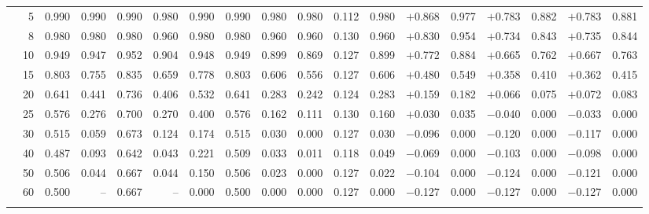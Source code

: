 \documentclass[conference]{IEEEtran}
\theoremstyle{remark}
\begin{document}
\begin{table}[ht]
{\begin{tabular}{p{2.2cm}r rrrr rr rr rr rr rr rr}
  & 5  & 0.990 & 0.990 & 0.990 & 0.980 & 0.990 & 0.990 & 0.980 & 0.980 & 0.112 & 0.980 & $+$0.868 & 0.977 & $+$0.783 & 0.882 & $+$0.783 & 0.881 \\
  & 8  & 0.980 & 0.980 & 0.980 & 0.960 & 0.980 & 0.980 & 0.960 & 0.960 & 0.130 & 0.960 & $+$0.830 & 0.954 & $+$0.734 & 0.843 & $+$0.735 & 0.844 \\
  & 10 & 0.949 & 0.947 & 0.952 & 0.904 & 0.948 & 0.949 & 0.899 & 0.869 & 0.127 & 0.899 & $+$0.772 & 0.884 & $+$0.665 & 0.762 & $+$0.667 & 0.763 \\
  & 15 & 0.803 & 0.755 & 0.835 & 0.659 & 0.778 & 0.803 & 0.606 & 0.556 & 0.127 & 0.606 & $+$0.480 & 0.549 & $+$0.358 & 0.410 & $+$0.362 & 0.415 \\
  & 20 & 0.641 & 0.441 & 0.736 & 0.406 & 0.532 & 0.641 & 0.283 & 0.242 & 0.124 & 0.283 & $+$0.159 & 0.182 & $+$0.066 & 0.075 & $+$0.072 & 0.083 \\
  & 25 & 0.576 & 0.276 & 0.700 & 0.270 & 0.400 & 0.576 & 0.162 & 0.111 & 0.130 & 0.160 & $+$0.030 & 0.035 & $-$0.040 & 0.000 & $-$0.033 & 0.000 \\
  & 30 & 0.515 & 0.059 & 0.673 & 0.124 & 0.174 & 0.515 & 0.030 & 0.000 & 0.127 & 0.030 & $-$0.096 & 0.000 & $-$0.120 & 0.000 & $-$0.117 & 0.000 \\
  & 40 & 0.487 & 0.093 & 0.642 & 0.043 & 0.221 & 0.509 & 0.033 & 0.011 & 0.118 & 0.049 & $-$0.069 & 0.000 & $-$0.103 & 0.000 & $-$0.098 & 0.000 \\
  & 50 & 0.506 & 0.044 & 0.667 & 0.044 & 0.150 & 0.506 & 0.023 & 0.000 & 0.127 & 0.022 & $-$0.104 & 0.000 & $-$0.124 & 0.000 & $-$0.121 & 0.000 \\
  & 60 & 0.500 & -- & 0.667 & -- & 0.000 & 0.500 & 0.000 & 0.000 & 0.127 & 0.000 & $-$0.127 & 0.000 & $-$0.127 & 0.000 & $-$0.127 & 0.000 \\
\midrule
{}

\end{tabular}}
\end{table}
\end{document}

